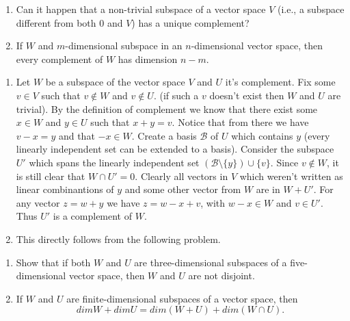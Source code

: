 \begin{problem}
  \begin{enumerate}[label=(\alph*)]
    \item Can it happen that a non-trivial subspace of a vector space $V$ (i.e., a subspace different from both $0$ and $V$) has a unique complement?
    \item If $W$ and $m$-dimensional subspace in an $n$-dimensional vector space, then every complement of $W$ has dimension $n - m$.
  \end{enumerate}
\end{problem}

\begin{solution}
  \begin{enumerate}[label=(\alph*)]
    \item Let $W$ be a subspace of the vector space $V$ and $U$ it's complement.
      Fix some $v \in V$ such that $v \notin W$ and $v \notin U$. (if such a $v$ doesn't exist then $W$ and $U$ are trivial).
      By the definition of complement we know that there exist some $x \in W$ and $y \in U$ such that $x + y = v$.
      Notice that from there we have $v - x = y$ and that $- x \in W$.
      Create a basis $\mathcal{B}$ of $U$ which contains $y$ (every linearly independent set can be extended to a basis).
      Consider the subspace $U'$ which spans the linearly independent set $(\mathcal{B} \setminus \{y\}) \cup \{v\}$.
      Since $v \notin W$, it is still clear that $W \cap U' = 0$.
      Clearly all vectors in $V$ which weren't written as linear combinantions of $y$ and some other vector from $W$ are in $W + U'$.
      For any vector $z = w + y$ we have $z = w - x + v$, with $w - x \in W$ and $v \in U'$.
      Thus $U'$ is a complement of $W$.
    \item This directly follows from the following problem.
  \end{enumerate}
\end{solution}

\begin{problem}
  \begin{enumerate}[label=(\alph*)]
    \item Show that if both $W$ and $U$ are three-dimensional subspaces of a five-dimensional vector space, then $W$ and $U$ are not disjoint.
    \item If $W$ and $U$ are finite-dimensional subspaces of a vector space, then
      \[dim W + dim U = dim (W + U) + dim (W \cap U).\]
  \end{enumerate}
\end{problem}


